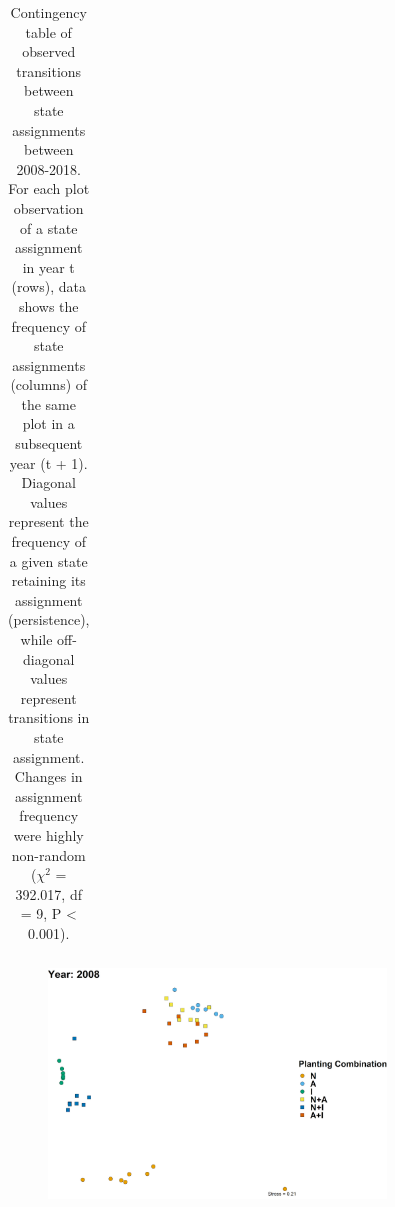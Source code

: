 \documentclass[twoside,12pt,final]{ucthesis-CA2012}
\begin{document}
\begin{ucmainmatter}
\begin{table}[ht]
{\begin{tabular}{lllll}
   \hline
\end{tabular}
}
\caption{Contingency table of observed transitions between state assignments between 2008-2018. For each plot observation of a state assignment in year t (rows), data shows the frequency of state assignments (columns) of the same plot in a subsequent year (t + 1). Diagonal values represent the frequency of a given state retaining its assignment (persistence), while off-diagonal values represent transitions in state assignment. Changes in assignment frequency were highly non-random ($\chi^2$ = 392.017, df = 9, P < 0.001).} 
\end{table}
\begin{table}[ht]
\centering
{}
\caption{AIC model comparison used to select the best fit multi-state model from a series of candidates. Covariates include “Priority Effects” – the effect of initial seeding mixture representation of indicator species correlated with cluster assignments – and “1-“, “2-“, and “3-year SPEI” – a standardized measure of drought stress computed over 1, 2, and 3 cumulative water year intervals, respectively. DF corresponds to the number of parameters estimated within the transition matrix, including baseline transition probabilities and effects of covariates.} 
\end{table}
\begin{figure}
\centering
\includegraphics[width=0.8\textwidth,height=0.4\textheight]{figure/AppFig3_1.png}

\end{figure}
\end{ucmainmatter}
\end{document}
